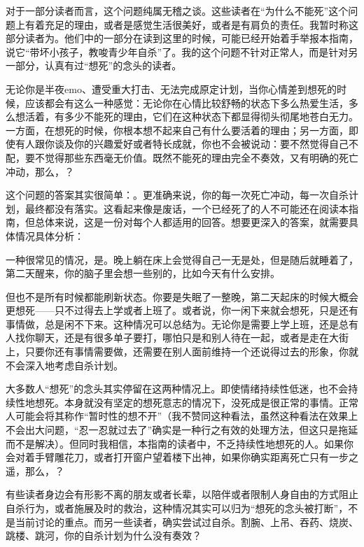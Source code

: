 \begin{toparent}
    对于一部分读者而言，这个问题纯属无稽之谈。这些读者在“为什么不能死”这个问题上有着充足的理由，或者是感觉生活很美好，或者是有肩负的责任。我暂时称这部分读者为。他们中的一部分在读到这里的时候，可能已经开始着手举报本指南，说它“带坏小孩子，教唆青少年自杀”了。我的这个问题不针对正常人，而是针对另一部分，认真有过“想死”的念头的读者。
\end{toparent}
无论你是半夜emo、遭受重大打击、无法完成原定计划，当你心情差到想死的时候，应该都会有这么一种感觉：无论你在心情比较舒畅的状态下多么热爱生活，多么想活着，有多少不能死的理由，它们在这种状态下都显得彻头彻尾地苍白无力。一方面，在想死的时候，你根本想不起来自己有什么要活着的理由；另一方面，即使有人跟你谈及你的兴趣爱好或者特长成就，你也不会被说动：要不然觉得自己不配，要不觉得那些东西毫无价值。既然不能死的理由完全不奏效，又有明确的死亡冲动，那么，？

这个问题的答案其实很简单：。更准确来说，你的每一次死亡冲动，每一次自杀计划，最终都没有落实。这看起来像是废话，一个已经死了的人不可能还在阅读本指南，但总体来说，这是一份对每个人都适用的回答。想要更深入的答案，就需要具体情况具体分析：

一种很常见的情况，是。晚上躺在床上会觉得自己一无是处，但是随后就睡着了，第二天醒来，你的脑子里会想一些别的，比如今天有什么安排。

但也不是所有时候都能刷新状态。你要是失眠了一整晚，第二天起床的时候大概会更想死——只不过得去上学或者上班了。或者说，你一闲下来就会想死，只是还有事情做，总是闲不下来。这种情况可以总结为。无论你是需要上学上班，还是总有人找你聊天，还是有很多单子要打，哪怕只是和别人待在一起，或者是走在大街上，只要你还有事情需要做，还需要在别人面前维持一个还说得过去的形象，你就不会深入地考虑自杀计划。

大多数人“想死”的念头其实停留在这两种情况上。即使情绪持续性低迷，也不会持续性地想死。本身就没有坚定的想死意志的情况下，没死成是很正常的事情。正常人可能会将其称作“暂时性的想不开”（我不赞同这种看法，虽然这种看法在效果上不会出大问题，“忍一忍就过去了”确实是一种行之有效的处理方法，但这只是拖延而不是解决）。但同时我相信，本指南的读者中，不乏持续性地想死的人。如果你会对着手臂雕花刀，或者打开窗户望着楼下出神，如果你确实距离死亡只有一步之遥，那么，？

有些读者身边会有形影不离的朋友或者长辈，以陪伴或者限制人身自由的方式阻止自杀行为，或者施展及时的救治，这种情况其实可以归为“想死的念头被打断”，不是当前讨论的重点。而另一些读者，确实尝试过自杀。割腕、上吊、吞药、烧炭、跳楼、跳河，你的自杀计划为什么没有奏效？

